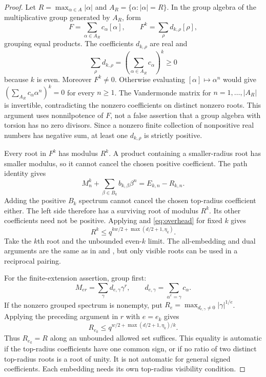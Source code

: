 \begin{proof}
Let $R=\max_{\alpha\in A}|\alpha|$ and
$A_R=\{\alpha:|\alpha|=R\}$. In the group algebra of the multiplicative group
generated by $A_R$, form
\[
 F=\sum_{\alpha\in A_R}c_\alpha[\alpha],\qquad
 F^k=\sum_\rho d_{k,\rho}[\rho],
\]
grouping equal products. The coefficients $d_{k,\rho}$ are real and
\[
 \sum_\rho d_{k,\rho}
   =\left(\sum_{\alpha\in A_R}c_\alpha\right)^k\ge0
\]
because $k$ is even. Moreover $F^k\ne0$. Otherwise evaluating
$[\alpha]\mapsto\alpha^n$ would give
$(\sum_{A_R}c_\alpha\alpha^n)^k=0$ for every $n\ge1$.
The Vandermonde matrix for $n=1,\ldots,|A_R|$ is invertible, contradicting
the nonzero coefficients on distinct nonzero roots. This argument uses
nonnilpotence of $F$, not a false assertion that a group algebra with
torsion has no zero divisors. Since a nonzero finite collection of
nonpositive real numbers has negative sum, at least one $d_{k,\rho}$ is
strictly positive.

Every root in $F^k$ has modulus $R^k$. A product containing a smaller-radius
root has smaller modulus, so it cannot cancel the chosen positive
coefficient. The path identity gives
\[
 M_n^k+\sum_{\beta\in B_k}b_{k,\beta}\beta^n=E_{k,n}-R_{k,n}.
\]
Adding the positive $B_k$ spectrum cannot cancel the chosen top-radius
coefficient either. The left side therefore has a surviving root of modulus
$R^k$. Its other coefficients need not be positive. Applying 
and \eqref{eq:overhead} for fixed $k$ gives
\[
 R^k\le q^{kw/2+\max(d/2+1,\eta_k)}.
\]
Take the $k$th root and the unbounded even-$k$ limit. The all-embedding and
dual arguments are the same as in  and , but only visible
roots can be used in a reciprocal pairing.

For the finite-extension assertion, group first:
\[
 M_{er}=\sum_\gamma d_{e,\gamma}\gamma^r,
 \qquad d_{e,\gamma}=\sum_{\alpha^e=\gamma}c_\alpha.
\]
If the nonzero grouped spectrum is nonempty, put
$R_e=\max_{d_{e,\gamma}\ne0}|\gamma|^{1/e}$. Applying the preceding
argument in $r$ with $e=e_k$ gives
\[
 R_{e_k}\le q^{w/2+\max(d/2+1,\eta_k)/k}.
\]
Thus $R_{e_k}=R$ along an unbounded allowed set suffices. This equality is
automatic if the top-radius coefficients have one common sign, or if no
ratio of two distinct top-radius roots is a root of unity. It is not
automatic for general signed coefficients. Each embedding needs its own
top-radius visibility condition.
\end{proof}

